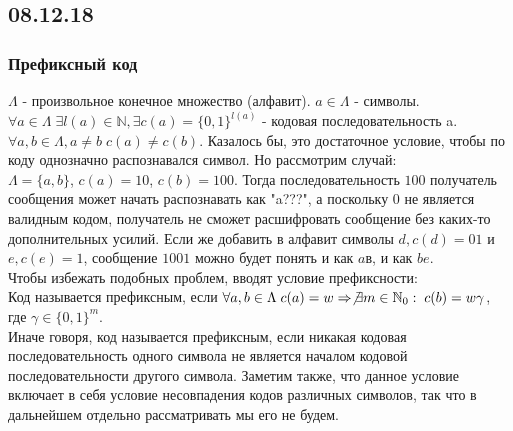 \subsection{08.12.18}
\subsubsection{Префиксный код}
$\Lambda$ - произвольное конечное множество (алфавит). $a \in \Lambda$ - символы.\\
$\forall a \in \Lambda \; \exists l(a) \in \mathbb{N}, \exists c(a) = \{0, 1\}^{l(a)}$ - кодовая последовательность a.\\
$\forall a, b \in \Lambda, a \not= b \; c(a) \not= c(b)$. Казалось бы, это достаточное условие, чтобы по коду однозначно распознавался символ. Но рассмотрим случай:\\
$\Lambda = \{a, b\}$, $c(a) = 10$, $c(b) = 100$. Тогда последовательность $100$ получатель сообщения может начать распознавать как "a???", а поскольку 0 не является валидным кодом, получатель не сможет расшифровать сообщение без каких-то дополнительных усилий. Если же добавить в алфавит символы $d, c(d) = 01$ и $e, c(e) = 1$, сообщение $1001$ можно будет понять и как $aв$, и как $be$.\\
Чтобы избежать подобных проблем, вводят условие префиксности:\\
Код называется префиксным, если $\forall a, b \in \Lambda \; c(a) = w \Rightarrow \not\exists m \in \mathbb{N}_0: \; c(b) = w\gamma$, где $\gamma \in \{0, 1\}^m$.\\
Иначе говоря, код называется префиксным, если никакая кодовая последовательность одного символа не является началом кодовой последовательности другого символа. Заметим также, что данное условие включает в себя условие несовпадения кодов различных символов, так что в дальнейшем отдельно рассматривать мы его не будем.\\

